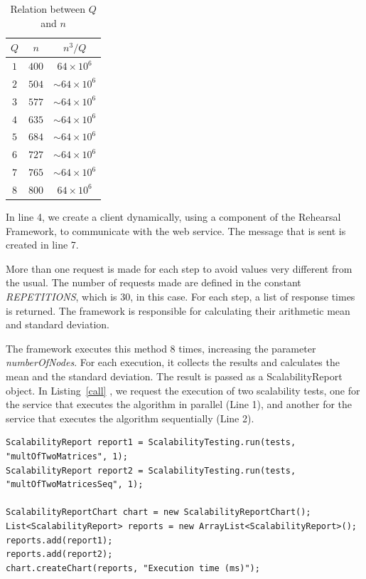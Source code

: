 \begin{table}[htdp]
\begin{center}
\begin{tabular}{|c|c|c|}
\hline
$Q$ 	& $n$ 	& $n^3/Q$ \\ \hline
$1$	& $400$	& $64 \times 10^6$ \\ \hline
$2$	& $504$	& $\sim64 \times 10^6$ \\ \hline
$3$	& $577$	& $\sim64 \times 10^6$ \\ \hline
$4$	& $635$	& $\sim64 \times 10^6$ \\ \hline
$5$	& $684$	& $\sim64 \times 10^6$ \\ \hline
$6$	& $727$	& $\sim64 \times 10^6$ \\ \hline
$7$	& $765$	& $\sim64 \times 10^6$ \\ \hline
$8$	& $800$	& $64 \times 10^6$ \\ \hline

\end{tabular}
\end{center}
\caption{Relation between $Q$ and $n$}
\label{table1}
\end{table}%

In line 4, we create a client dynamically, using a component of the Rehearsal Framework, to communicate with the web service. The message that is sent is created in line 7. 

More than one request is made for each step to avoid values very different from the usual. The number of requests made are defined in the constant \emph{REPETITIONS}, which is 30, in this case. For each step, a list of response times is returned. The framework is responsible for calculating their arithmetic mean and standard deviation.

The framework executes this method 8 times, increasing the parameter \emph{numberOfNodes}. For each execution, it collects the results and calculates the mean and the standard deviation. The result is passed as a ScalabilityReport object. In Listing~\ref{call} , we request the execution of two scalability tests, one for the service that executes the algorithm in parallel (Line 1), and another for the service that executes the algorithm sequentially (Line 2).

\begin{lstlisting}
ScalabilityReport report1 = ScalabilityTesting.run(tests, "multOfTwoMatrices", 1);
ScalabilityReport report2 = ScalabilityTesting.run(tests, "multOfTwoMatricesSeq", 1);

ScalabilityReportChart chart = new ScalabilityReportChart();
List<ScalabilityReport> reports = new ArrayList<ScalabilityReport>();
reports.add(report1);
reports.add(report2);
chart.createChart(reports, "Execution time (ms)");
\end{lstlisting} 

